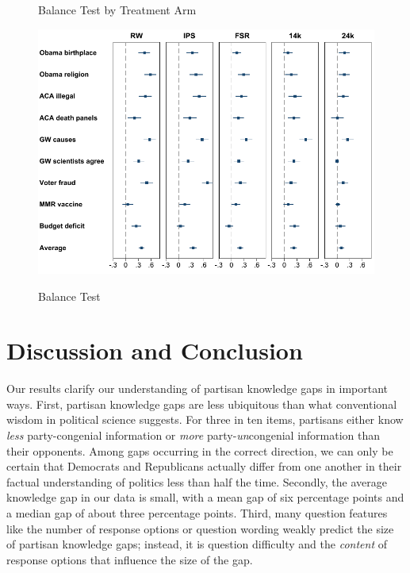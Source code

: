 \documentclass[12pt, letterpaper]{article}
\begin{document}
\begin{center}
\begin{figure}[H]
  \centering
  \caption{Balance Test by Treatment Arm}
  \includegraphics[scale=.8]{../figs/partisan-gap-by-item-arm.pdf}
  \label{fig:figbias}
  \caption*{Balance Test}
\end{figure}
\end{center}

\vspace{-10mm}

\section*{Discussion and Conclusion}

Our results clarify our understanding of partisan knowledge gaps in important ways. First, partisan knowledge gaps are less ubiquitous than what conventional wisdom in political science suggests. For three in ten items, partisans either know \textit{less} party-congenial information or \textit{more} party-\textit{un}congenial information than their opponents. Among gaps occurring in the correct direction, we can only be certain that Democrats and Republicans actually differ from one another in their factual understanding of politics less than half the time. Secondly, the average knowledge gap in our data is small, with a mean gap of six percentage points and a median gap of about three percentage points. Third, many question features like the number of response options or question wording weakly predict the size of partisan knowledge gaps; instead, it is question difficulty and the \textit{content} of response options that influence the size of the gap.
\end{document}

